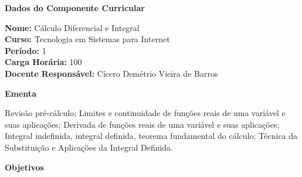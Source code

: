 

\begin{snugshade}\begin{center}\textbf{
	Dados do Componente Curricular
}\end{center}\end{snugshade}

\noindent \textbf{Nome:} Cálculo Diferencial e Integral
\\        \textbf{Curso:} Tecnologia em Sistemas para Internet
\\        \textbf{Período:} \unit{1}{\degree}
\\        \textbf{Carga Horária:} \unit{100}{\hour}
\\        \textbf{Docente Responsável:} Cícero Demétrio Vieira de Barros      


\begin{snugshade}\begin{center}\textbf{
    Ementa
\vphantom{q}}\end{center}\end{snugshade}

\noindent
Revisão pré-cálculo; Limites e continuidade de funções reais de uma variável e suas aplicações; Derivada de funções reais de uma variável e suas aplicações; Integral indefinida, integral definida, teorema fundamental do cálculo; Técnica da Substituição e Aplicações da Integral Definida.

\begin{snugshade}\begin{center}\textbf{
    Objetivos
}\end{center}\end{snugshade}

